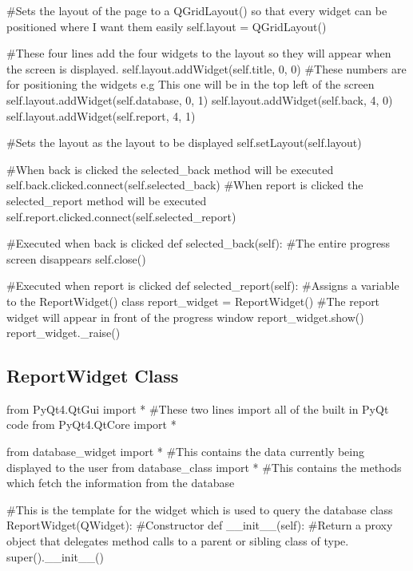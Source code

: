 \begin{landscape}
\begin{python}
        #Sets the layout of the page to a QGridLayout() so that every widget can be positioned where I want them easily
        self.layout = QGridLayout()

        #These four lines add the four widgets to the layout so they will appear when the screen is displayed.
        self.layout.addWidget(self.title, 0, 0) #These numbers are for positioning the widgets e.g This one will be in the top left of the screen
        self.layout.addWidget(self.database, 0, 1)
        self.layout.addWidget(self.back, 4, 0)
        self.layout.addWidget(self.report, 4, 1)

        #Sets the layout as the layout to be displayed
        self.setLayout(self.layout)

        #When back is clicked the selected_back method will be executed
        self.back.clicked.connect(self.selected_back)
        #When report is clicked the selected_report method will be executed
        self.report.clicked.connect(self.selected_report)

    #Executed when back is clicked
    def selected_back(self):
        #The entire progress screen disappears
        self.close()

    #Executed when report is clicked
    def selected_report(self):
        #Assigns a variable to the ReportWidget() class
        report_widget = ReportWidget()
        #The report widget will appear in front of the progress window
        report_widget.show()
        report_widget._raise()
\end{python}

\subsection{ReportWidget Class}

\begin{python}
from PyQt4.QtGui import * #These two lines import all of the built in PyQt code
from PyQt4.QtCore import *

from database_widget import * #This contains the data currently being displayed to the user
from database_class import * #This contains the methods which fetch the information from the database

#This is the template for the widget which is used to query the database
class ReportWidget(QWidget):
    #Constructor
    def __init__(self):
        #Return a proxy object that delegates method calls to a parent or sibling class of type.
        super().__init__()


\end{python}
\end{landscape}
